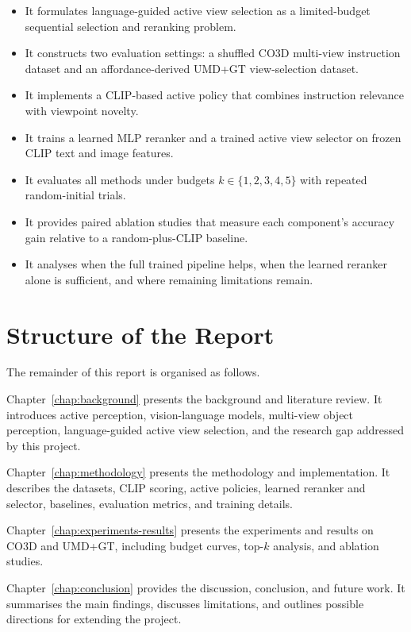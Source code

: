 \begin{itemize}
    \item It formulates language-guided active view selection as a limited-budget sequential selection and reranking problem.
    \item It constructs two evaluation settings: a shuffled CO3D multi-view instruction dataset and an affordance-derived UMD+GT view-selection dataset.
    \item It implements a CLIP-based active policy that combines instruction relevance with viewpoint novelty.
    \item It trains a learned MLP reranker and a trained active view selector on frozen CLIP text and image features.
    \item It evaluates all methods under budgets \(k \in \{1,2,3,4,5\}\) with repeated random-initial trials.
    \item It provides paired ablation studies that measure each component's accuracy gain relative to a random-plus-CLIP baseline.
    \item It analyses when the full trained pipeline helps, when the learned reranker alone is sufficient, and where remaining limitations remain.
\end{itemize}

\section{Structure of the Report}

The remainder of this report is organised as follows.

Chapter~\ref{chap:background} presents the background and literature review. It introduces active perception, vision-language models, multi-view object perception, language-guided active view selection, and the research gap addressed by this project.

Chapter~\ref{chap:methodology} presents the methodology and implementation. It describes the datasets, CLIP scoring, active policies, learned reranker and selector, baselines, evaluation metrics, and training details.

Chapter~\ref{chap:experiments-results} presents the experiments and results on CO3D and UMD+GT, including budget curves, top-\(k\) analysis, and ablation studies.

Chapter~\ref{chap:conclusion} provides the discussion, conclusion, and future work. It summarises the main findings, discusses limitations, and outlines possible directions for extending the project.
